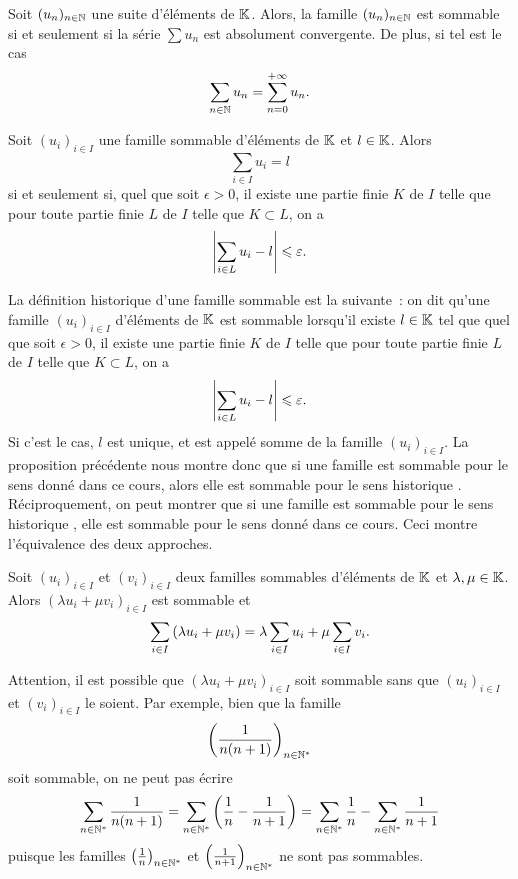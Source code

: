 \documentclass{magnolia}
\begin{document}
\begin{proposition}
Soit $(u_n)_{n\in\mathbb{N}}$ une suite d'éléments de $\mathbb{K}$. Alors, la famille $(u_n)_{n\in\mathbb{N}}$ est
sommable si et seulement si la série $\sum u_n$ est absolument convergente. De plus, si tel est le
cas
\[\sum_{n\in\mathbb{N}} u_n=\sum_{n=0}^{+\infty} u_n.\]
\end{proposition}
  

\begin{proposition}
Soit $(u_i)_{i\in I}$ une famille sommable d'éléments de $\mathbb{K}$ et $l\in\mathbb{K}$. Alors
\[\sum_{i\in I} u_i=l\]
si et seulement si, quel que soit $\epsilon>0$, il existe une partie finie $K$ de $I$ telle que
pour toute partie finie $L$ de $I$ telle que $K\subset L$, on a
\[\left|\sum_{i\in L} u_i - l\right|\leqslant\varepsilon.\]
\end{proposition}

\begin{remarqueUnique}
\remarque La définition \og historique \fg d'une famille sommable est la suivante~: on dit
  qu'une famille $(u_i)_{i\in I}$ d'éléments de $\mathbb{K}$ est sommable lorsqu'il existe $l\in\mathbb{K}$ tel que quel
  que soit $\epsilon>0$, il existe une partie finie $K$ de $I$ telle que pour toute partie finie $L$ de
  $I$ telle que $K\subset L$, on a
  \[\left|\sum_{i\in L} u_i - l\right|\leqslant\varepsilon.\]
  Si c'est le cas, $l$ est unique, et est appelé somme de la famille $(u_i)_{i\in I}$. La proposition
  précédente nous montre donc que si une famille est sommable pour le sens donné dans ce cours,
  alors elle est sommable pour le sens \og historique \fg. Réciproquement, on peut montrer que si une famille
  est sommable pour le sens \og historique \fg, elle est sommable pour le sens donné dans ce cours.
  Ceci montre l'équivalence des deux approches.
\end{remarqueUnique}

\begin{proposition}
Soit $(u_i)_{i\in I}$ et $(v_i)_{i\in I}$ deux familles sommables d'éléments de $\mathbb{K}$ et
$\lambda,\mu\in\mathbb{K}$. Alors $(\lambda u_i+\mu v_i)_{i\in I}$ est sommable et
\[\sum_{i\in I} \left(\lambda u_i+\mu v_i\right) = \lambda \sum_{i\in I} u_i + \mu \sum_{i\in I} v_i.\]
\end{proposition}

\begin{remarqueUnique}
\remarque Attention, il est possible que $(\lambda u_i+\mu v_i)_{i\in I}$ soit sommable sans
  que $(u_i)_{i\in I}$ et $(v_i)_{i\in I}$ le soient. Par exemple, bien que la famille
  \[\left(\frac{1}{n(n+1)}\right)_{n\in{\mathbb{N}^*}}\] soit sommable, on ne peut pas écrire
  \[\sum_{n\in{\mathbb{N}^*}} \frac{1}{n(n+1)}=\sum_{n\in{\mathbb{N}^*}} \left(\frac{1}{n}-\frac{1}{n+1}\right)=
    \sum_{n\in{\mathbb{N}^*}} \frac{1}{n} - \sum_{n\in{\mathbb{N}^*}}\frac{1}{n+1}\]
  puisque les familles $\left(\frac{1}{n}\right)_{n\in{\mathbb{N}^*}}$ et $\left(\frac{1}{n+1}\right)_{n\in{\mathbb{N}^*}}$ ne sont pas sommables.
\end{remarqueUnique}
\end{document}
